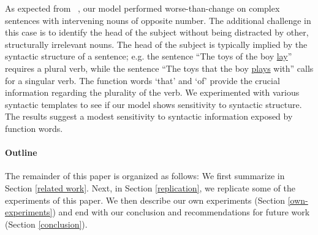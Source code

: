 As expected from ~\citep{Linzen2016}, our model performed 
worse-than-change on complex sentences with
intervening nouns of opposite number.
The additional challenge in this case is
to identify the head of the subject 
without being distracted by other, 
structurally irrelevant nouns. 
The head of the subject is typically implied 
by the syntactic structure of a sentence;
e.g. the sentence ``The toys of the boy \underline{lay}''
requires a plural verb, while the sentence
``The toys that the boy \underline{plays} with''
calls for a singular verb.
The function words `that' and `of' 
provide the crucial information 
regarding the plurality of the verb.
We experimented with various syntactic templates
to see if our model shows sensitivity to
syntactic structure.
The results suggest a 
modest sensitivity to syntactic information 
exposed by function words. 



\paragraph{Outline}
The remainder of this paper is organized as follows:
We first summarize \citep{Linzen2016} in Section \ref{related work}.
Next, in Section \ref{replication}, we replicate 
some of the experiments of this paper.
We then describe our own experiments (Section \ref{own-experiments})
and end with our conclusion and recommendations 
for future work (Section \ref{conclusion}).



